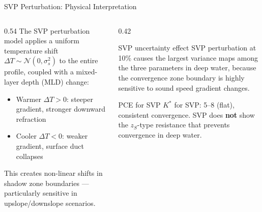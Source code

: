 \documentclass[aspectratio=169,12pt]{beamer}
\begin{document}
\begin{frame}{SVP Perturbation: Physical Interpretation}
  \begin{columns}[T]
    \begin{column}{0.54\textwidth}
      The SVP perturbation model applies a uniform temperature shift
      $\Delta T \sim \mathcal{N}(0,\sigma_s^2)$ to the entire profile,
      coupled with a mixed-layer depth (MLD) change:
      \begin{itemize}
        \item Warmer $\Delta T > 0$: steeper gradient, stronger downward refraction
        \item Cooler $\Delta T < 0$: weaker gradient, surface duct collapses
      \end{itemize}
      \vspace{0.5em}
      This creates \alert{non-linear} shifts in shadow zone boundaries —
      particularly sensitive in upslope/downslope scenarios.
    \end{column}
    \begin{column}{0.42\textwidth}
      \begin{block}{SVP uncertainty effect}
        SVP perturbation at 10\% causes the largest variance maps
        among the three parameters in deep water,
        because the convergence zone boundary is highly sensitive
        to sound speed gradient changes.
      \end{block}
      \vspace{0.4em}
      \begin{alertblock}{PCE for SVP}
        $K^*$ for SVP: 5--8 (flat), consistent convergence.
        SVP does \textbf{not} show the $z_S$-type resistance
        that prevents convergence in deep water.
      \end{alertblock}
    \end{column}
  \end{columns}
\end{frame}
\end{document}
